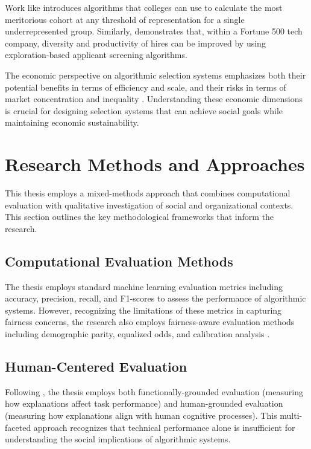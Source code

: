 Work like \textcite{kleinberg2018algorithmic} introduces algorithms that colleges can use to calculate the most meritorious cohort at any threshold of representation for a single underrepresented group. Similarly, \textcite{li2020hiring} demonstrates that, within a Fortune 500 tech company, diversity and productivity of hires can be improved by using exploration-based applicant screening algorithms.

The economic perspective on algorithmic selection systems emphasizes both their potential benefits in terms of efficiency and scale, and their risks in terms of market concentration and inequality \cite{autor2020work}. Understanding these economic dimensions is crucial for designing selection systems that can achieve social goals while maintaining economic sustainability.

\section{Research Methods and Approaches}\label{sec:research_methods}

This thesis employs a mixed-methods approach that combines computational evaluation with qualitative investigation of social and organizational contexts. This section outlines the key methodological frameworks that inform the research.

\subsection{Computational Evaluation Methods}
The thesis employs standard machine learning evaluation metrics including accuracy, precision, recall, and F1-scores to assess the performance of algorithmic systems. However, recognizing the limitations of these metrics in capturing fairness concerns, the research also employs fairness-aware evaluation methods including demographic parity, equalized odds, and calibration analysis \cite{mehrabi2021survey}.

\subsection{Human-Centered Evaluation}
Following \textcite{doshi-velez_towards_2017}, the thesis employs both functionally-grounded evaluation (measuring how explanations affect task performance) and human-grounded evaluation (measuring how explanations align with human cognitive processes). This multi-faceted approach recognizes that technical performance alone is insufficient for understanding the social implications of algorithmic systems.

